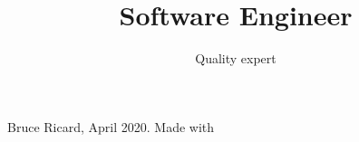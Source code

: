 \documentclass{curve}
\title{Software Engineer}
\subtitle{Quality expert}
\begin{document}
\makeheaders[t]
\maketitle

\newpage
\makeheaders[t]


\vfill
\begin{center}
\tiny Bruce Ricard, April 2020. Made with \LaTeXe
\end{center}
\end{document}
